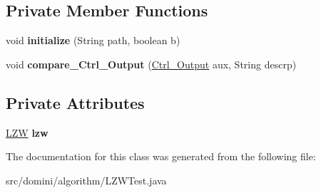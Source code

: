 \subsection*{Private Member Functions}
\begin{DoxyCompactItemize}
\item 
\mbox{\label{classdomini_1_1algorithm_1_1LZWTest_ada0027ded255816544693ea880a84ba4}} 
void {\bfseries initialize} (String path, boolean b)
\item 
\mbox{\label{classdomini_1_1algorithm_1_1LZWTest_aa82770367d62f73e70ffc7d67e5ce2bf}} 
void {\bfseries compare\+\_\+\+Ctrl\+\_\+\+Output} (\hyperlink{classpersistencia_1_1output_1_1Ctrl__Output}{Ctrl\+\_\+\+Output} aux, String descrp)
\end{DoxyCompactItemize}
\subsection*{Private Attributes}
\begin{DoxyCompactItemize}
\item 
\mbox{\label{classdomini_1_1algorithm_1_1LZWTest_a591c1bb9b927631d0e60a2853e502d20}} 
\hyperlink{classdomini_1_1algorithm_1_1LZW}{L\+ZW} {\bfseries lzw}
\end{DoxyCompactItemize}


The documentation for this class was generated from the following file\+:\begin{DoxyCompactItemize}
\item 
src/domini/algorithm/L\+Z\+W\+Test.\+java\end{DoxyCompactItemize}
